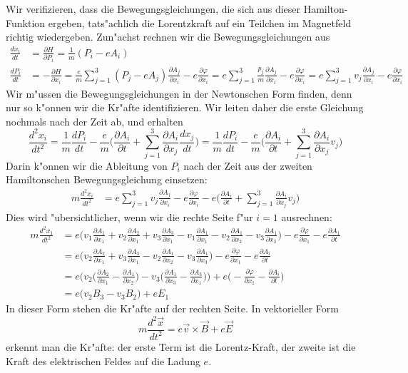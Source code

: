 Wir verifizieren, dass die Bewegungsgleichungen, die sich aus dieser
Hamilton-Funktion ergeben, tats"achlich die Lorentzkraft auf ein
Teilchen im Magnetfeld richtig wiedergeben.
Zun"achst rechnen wir die Bewegungsgleichungen aus
\begin{align*}
\frac{dx_i}{dt}
&=
\frac{\partial H}{\partial P_i}
=
\frac1m(P_i-eA_i)
\\
\frac{dP_i}{dt}
&=
-\frac{\partial H}{\partial x_i}
=
\frac{e}{m}\sum_{j=1}^3( P_j-eA_j)\frac{\partial A_j}{\partial x_i}
-e\frac{\partial\varphi}{\partial x_i}
=
e\sum_{j=1}^3\frac{p_j}{m}\frac{\partial A_j}{\partial x_i}
-e\frac{\partial\varphi}{\partial x_i}
=
e\sum_{j=1}^3v_j\frac{\partial A_j}{\partial x_i}
-e\frac{\partial\varphi}{\partial x_i}
\end{align*}
Wir m"ussen die Bewegungsgleichungen in der Newtonschen Form 
finden, denn nur so k"onnen wir die Kr"afte identifizieren.
Wir leiten daher die erste Gleichung nochmals nach der Zeit ab,
und erhalten
\[
\frac{d^2 x_i}{dt^2}
=
\frac1m\frac{dP_i}{dt}-\frac{e}{m}\biggl(
\frac{\partial A_i}{\partial t}
+\sum_{j=1}^3\frac{\partial A_i}{\partial x_j}\frac{dx_j}{dt}
\biggr)
=
\frac1m\frac{dP_i}{dt}-\frac{e}{m}\biggl(
\frac{\partial A_i}{\partial t}
+
\sum_{j=1}^3\frac{\partial A_i}{\partial x_j}v_j
\biggr)
\]
Darin k"onnen wir die Ableitung von $P_i$ nach der Zeit aus der
zweiten Hamiltonschen Bewegungsgleichung einsetzen:
\begin{align*}
m\frac{d^2 x_i}{dt^2}
&=
e\sum_{j=1}^3v_j\frac{\partial A_j}{\partial x_i}
-e\frac{\partial\varphi}{\partial x_i}
-
e\biggl(
\frac{\partial A_i}{\partial t}
+\sum_{j=1}^3\frac{\partial A_i}{\partial x_j}v_j
\biggr)
\end{align*}
Dies wird "ubersichtlicher, wenn wir die rechte Seite f"ur $i=1$
ausrechnen:
\begin{align*}
m\frac{d^2 x_1}{dt^2}
&=
e\biggl(
v_1\frac{\partial A_1}{\partial x_1}
+
v_2\frac{\partial A_2}{\partial x_1}
+
v_3\frac{\partial A_3}{\partial x_1}
-
v_1\frac{\partial A_1}{\partial x_1}
-
v_2\frac{\partial A_1}{\partial x_2}
-
v_3\frac{\partial A_1}{\partial x_3}
\biggr)
-e\frac{\partial\varphi}{\partial x_1}
-e\frac{\partial A_1}{\partial t}
\\
&=
e\biggl(
v_2\frac{\partial A_2}{\partial x_1}
+
v_3\frac{\partial A_3}{\partial x_1}
-
v_2\frac{\partial A_1}{\partial x_2}
-
v_3\frac{\partial A_1}{\partial x_3}
\biggr)
-e\frac{\partial\varphi}{\partial x_1}
-e\frac{\partial A_i}{\partial t}
\\
&=
e\biggl(
v_2
\biggl(
\frac{\partial A_2}{\partial x_1}
-
\frac{\partial A_1}{\partial x_2}
\biggr)
-
v_3\biggr(
\frac{\partial A_1}{\partial x_3}
-
\frac{\partial A_3}{\partial x_1}
\biggr)
\biggr)
+e\biggl(
-\frac{\partial\varphi}{\partial x_1}
-\frac{\partial A_i}{\partial t}
\biggr)
\\
&=
e\biggl(
v_2B_3
-
v_3B_2
\biggr)
+eE_1
\end{align*}
In dieser Form stehen die Kr"afte auf der rechten Seite. 
In vektorieller Form
\[
m\frac{d^2\vec x}{dt^2}
=
e\vec v\times\vec B
+e\vec E
\]
erkennt man die Kr"afte: der erste Term ist die Lorentz-Kraft,
der zweite ist die Kraft des elektrischen Feldes auf die Ladung $e$.

